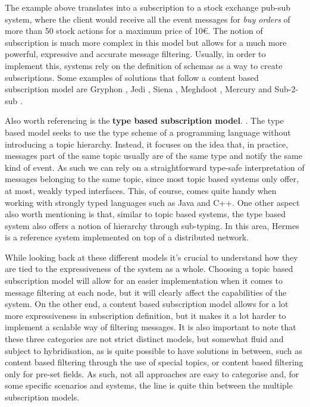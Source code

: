 The example above translates into a subscription to a stock exchange
pub-sub system, where the client would receive all the event messages
for \emph{buy orders} of more than 50 stock actions for a maximum price of
10\euro. The notion of subscription is much more complex in this
model but allows for a much more powerful, expressive and accurate
message filtering. Usually, in order to implement this, systems rely on
the definition of schemas as a way to create subscriptions. Some
examples of solutions that follow a content based subscription model are
Gryphon \cite{Strom1998}, Jedi \cite{Cugola2001}, Siena \cite{Carzaniga2003},
Meghdoot \cite{Gupta2004}, Mercury \cite{Bharambe2002} and Sub-2-sub \cite{Voulgaris2005}.
\bigskip

Also worth referencing is the \textbf{type based subscription model}.
\cite{Eugster2000}. The type based model seeks to use the type
scheme of a programming language without introducing a topic hierarchy.
Instead, it focuses on the idea that, in practice, messages part of the
same topic usually are of the same type and notify the same kind of
event. As such we can rely on a straightforward type-safe interpretation
of messages belonging to the same topic, since most topic based systems
only offer, at most, weakly typed interfaces. This, of course, comes
quite handy when working with strongly typed languages such as Java and
C++. One other aspect also worth mentioning is that, similar to topic
based systems, the type based system also offers a notion of hierarchy
through sub-typing. In this area, Hermes \cite{Pietzuch2002} is a
reference system implemented on top of a distributed network.

While looking back at these different models it's crucial to understand
how they are tied to the expressiveness of the system as a whole.
Choosing a topic based subscription model will allow for an easier
implementation when it comes to message filtering at each node, but it
will clearly affect the capabilities of the system. On the other end, a
content based subscription model allows for a lot more expressiveness in
subscription definition, but it makes it a lot harder to implement a
scalable way of filtering messages. It is also important to note that
these three categories are not strict distinct models, but somewhat
fluid and subject to hybridisation, as is quite possible to have
solutions in between, such as content based filtering through the use of
special topics, or content based filtering only for pre-set fields. As
such, not all approaches are easy to categorise and, for some specific
scenarios and systems, the line is quite thin between the multiple
subscription models.

